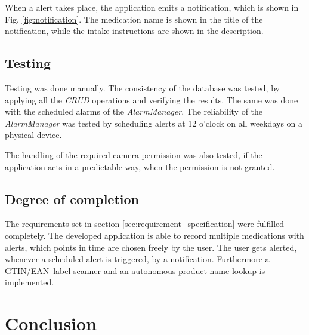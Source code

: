 \documentclass[conference]{IEEEtran}
\begin{document}
When a alert takes place, the application emits a notification, which is shown in Fig. \ref{fig:notification}.
The medication name is shown in the title of the notification, while the intake instructions are shown in the 
description.

\subsection{Testing}

Testing was done manually. The consistency of the database was tested, by applying all the \textit{CRUD} operations
and verifying the results. The same was done with the scheduled alarms of the \textit{AlarmManager}. The reliability
of the \textit{AlarmManager} was tested by scheduling alerts at 12 o'clock on all weekdays on a physical device.

The handling of the required camera permission was also tested, if the application acts in a predictable way, when
the permission is not granted.

\subsection{Degree of completion}

The requirements set in section \ref{sec:requirement_specification} were fulfilled completely. The developed 
application is able to record multiple medications with alerts, which points in time are chosen freely by the user.
The user gets alerted, whenever a scheduled alert is triggered, by a notification. Furthermore a GTIN/EAN--label
scanner and an autonomous product name lookup is implemented.

\section{Conclusion}

\lipsum[15] %
\end{document}
